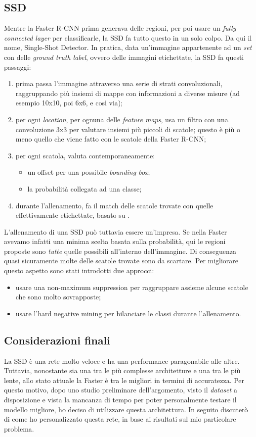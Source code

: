 \subsection{SSD}
Mentre la Faster R-CNN prima generava delle regioni, per poi usare un \textit{fully connected layer} per classificarle, la SSD fa tutto questo in un solo colpo. Da qui il nome, Single-Shot Detector.
In pratica, data un'immagine appartenente ad un \textit{set} con delle \textit{ground truth label}, ovvero delle immagini etichettate, la SSD fa questi passaggi:
\begin{enumerate}
	\item prima passa l'immagine attraverso una serie di strati convoluzionali, raggruppando più insiemi di mappe con informazioni a diverse misure (ad esempio 10x10, poi 6x6, e così via);
	\item per ogni \textit{location}, per ognuna delle \textit{feature maps}, usa un filtro con una convoluzione 3x3 per valutare insiemi più piccoli di scatole; questo è più o meno quello che viene fatto con le scatole della Faster R-CNN;
	\item per ogni scatola, valuta contemporaneamente:
	\begin{itemize}
		\item un offset per una possibile \textit{bounding box};
		\item la probabilità collegata ad una classe;
	\end{itemize}
	\item durante l'allenamento, fa il match delle scatole trovate con quelle effettivamente etichettate, basato su .
\end{enumerate}

L'allenamento di una SSD può tuttavia essere un'impresa. Se nella Faster avevamo infatti una minima scelta basata sulla probabilità, qui le regioni proposte sono \textit{tutte} quelle possibili all'interno dell'immagine. Di conseguenza quasi sicuramente molte delle scatole trovate sono da scartare. Per migliorare questo aspetto sono stati introdotti due approcci:
\begin{itemize}
	\item usare una \gls{non-maximum suppression} per raggruppare assieme alcune scatole che sono molto sovrapposte;
	\item usare l'\gls{hard negative mining} per bilanciare le classi durante l'allenamento.
\end{itemize}

\subsection{Considerazioni finali}
La SSD è una rete molto veloce e ha una performance paragonabile alle altre. Tuttavia, nonostante sia una tra le più complesse architetture e una tra le più lente, allo stato attuale la Faster è tra le migliori in termini di accuratezza. Per questo motivo, dopo uno studio preliminare dell'argomento, visto il \textit{dataset} a disposizione e vista la mancanza di tempo per poter personalmente testare il modello migliore, ho deciso di utilizzare questa architettura. In seguito discuterò di come ho personalizzato questa rete, in base ai risultati sul mio particolare problema.